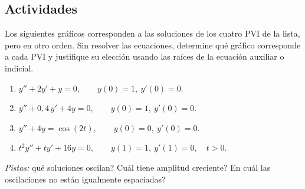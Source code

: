 \subsection*{Actividades}

\begin{activity}
    Los siguientes gr\'aficos corresponden a las soluciones de los cuatro PVI de la lista, pero en otro orden. Sin resolver las ecuaciones, determine qu\'e gr\'afico corresponde a cada PVI y justifique su elecci\'on usando las ra\'ices de la ecuaci\'on auxiliar o indicial.
    \begin{enumerate}[label=\arabic*.]
        \item $y''+2y'+y=0,\qquad y(0)=1,\ y'(0)=0$.
        \item $y''+0{,}4\,y'+4y=0,\qquad y(0)=1,\ y'(0)=0$.
        \item $y''+4y=\cos(2t),\qquad y(0)=0,\ y'(0)=0$.
        \item $t^2y''+ty'+16y=0,\qquad y(1)=1,\ y'(1)=0,\quad t>0$.
    \end{enumerate}
    \textit{Pistas:} \textquestiondown qu\'e soluciones oscilan? \textquestiondown Cu\'al tiene amplitud creciente? \textquestiondown En cu\'al las oscilaciones no est\'an igualmente espaciadas?
\end{activity}

